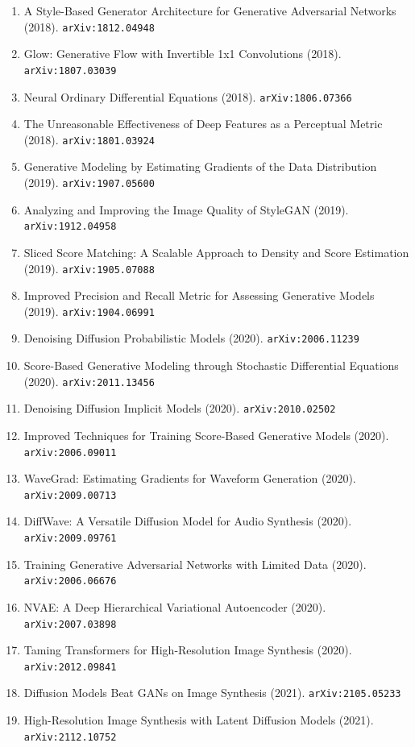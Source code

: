 \documentclass[11pt]{article}
\begin{document}
\begin{enumerate}
  \item A Style-Based Generator Architecture for Generative Adversarial Networks (2018). \texttt{arXiv:1812.04948}
  \item Glow: Generative Flow with Invertible 1x1 Convolutions (2018). \texttt{arXiv:1807.03039}
  \item Neural Ordinary Differential Equations (2018). \texttt{arXiv:1806.07366}
  \item The Unreasonable Effectiveness of Deep Features as a Perceptual Metric (2018). \texttt{arXiv:1801.03924}
  \item Generative Modeling by Estimating Gradients of the Data Distribution (2019). \texttt{arXiv:1907.05600}
  \item Analyzing and Improving the Image Quality of StyleGAN (2019). \texttt{arXiv:1912.04958}
  \item Sliced Score Matching: A Scalable Approach to Density and Score
  Estimation (2019). \texttt{arXiv:1905.07088}
  \item Improved Precision and Recall Metric for Assessing Generative Models (2019). \texttt{arXiv:1904.06991}
  \item Denoising Diffusion Probabilistic Models (2020). \texttt{arXiv:2006.11239}
  \item Score-Based Generative Modeling through Stochastic Differential
  Equations (2020). \texttt{arXiv:2011.13456}
  \item Denoising Diffusion Implicit Models (2020). \texttt{arXiv:2010.02502}
  \item Improved Techniques for Training Score-Based Generative Models (2020). \texttt{arXiv:2006.09011}
  \item WaveGrad: Estimating Gradients for Waveform Generation (2020). \texttt{arXiv:2009.00713}
  \item DiffWave: A Versatile Diffusion Model for Audio Synthesis (2020). \texttt{arXiv:2009.09761}
  \item Training Generative Adversarial Networks with Limited Data (2020). \texttt{arXiv:2006.06676}
  \item NVAE: A Deep Hierarchical Variational Autoencoder (2020). \texttt{arXiv:2007.03898}
  \item Taming Transformers for High-Resolution Image Synthesis (2020). \texttt{arXiv:2012.09841}
  \item Diffusion Models Beat GANs on Image Synthesis (2021). \texttt{arXiv:2105.05233}
  \item High-Resolution Image Synthesis with Latent Diffusion Models (2021). \texttt{arXiv:2112.10752}

\end{enumerate}
\end{document}
